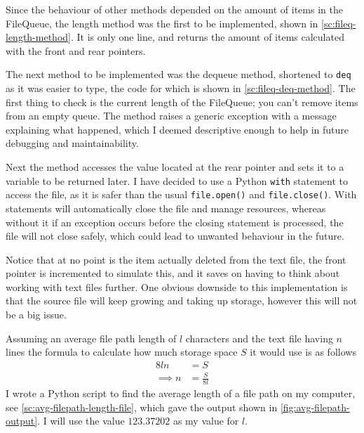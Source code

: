         Since the behaviour of other methods depended on the amount of items in the FileQueue, the length method was the first to be implemented, shown in \autoref{sc:fileq-length-method}. It is only one line, and returns the amount of items calculated with the front and rear pointers. 



        The next method to be implemented was the dequeue method, shortened to \verb|deq| as it was easier to type, the code for which is shown in \autoref{sc:fileq-deq-method}. The first thing to check is the current length of the FileQueue; you can't remove items from an empty queue. The method raises a generic exception with a message explaining what happened, which I deemed descriptive enough to help in future debugging and maintainability.

        Next the method accesses the value located at the rear pointer and sets it to a variable to be returned later. I have decided to use a Python \verb|with| statement to access the file, as it is safer than the usual \verb|file.open()| and \verb|file.close()|. With statements will automatically close the file and manage resources, whereas without it if an exception occurs before the closing statement is processed, the file will not close safely, which could lead to unwanted behaviour in the future. 

        Notice that at no point is the item actually deleted from the text file, the front pointer is incremented to simulate this, and it saves on having to think about working with text files further. One obvious downside to this implementation is that the source file will keep growing and taking up storage, however this will not be a big issue. 

        Assuming an average file path length of $l$ characters and the text file having $n$ lines the formula to calculate how much storage space $S$ it would use is as follows
        \begin{align*}
            8ln &= S \\
            \implies n &= \frac{S}{8l}
        \end{align*}
        I wrote a Python script to find the average length of a file path on my computer, see \autoref{sc:avg-filepath-length-file}, which gave the output shown in \autoref{fig:avg-filepath-output}. I will use the value $123.37202$ as my value for $l$. 

